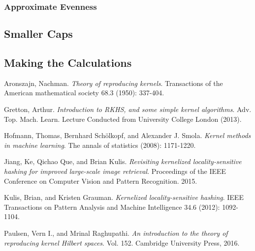 \documentclass[twoside,11pt]{homework}
\begin{document}
\begin{multicols}{2}
\subsubsection{Approximate Evenness}



\subsection{Smaller Caps}

\subsection{Making the Calculations}

\begin{thebibliography}{9}
  
 Aronszajn, Nachman. \emph{Theory of reproducing kernels}. Transactions of the American mathematical society 68.3 (1950): 337-404.

 Gretton, Arthur. \emph{Introduction to RKHS, and some simple kernel algorithms}. Adv. Top. Mach. Learn. Lecture Conducted from University College London (2013).

 Hofmann, Thomas, Bernhard Schölkopf, and Alexander J. Smola. \emph{Kernel methods in machine learning}. The annals of statistics (2008): 1171-1220.

 Jiang, Ke, Qichao Que, and Brian Kulis. \emph{Revisiting kernelized locality-sensitive hashing for improved large-scale image retrieval}. Proceedings of the IEEE Conference on Computer Vision and Pattern Recognition. 2015.
  
 Kulis, Brian, and Kristen Grauman. \emph{Kernelized locality-sensitive hashing}. IEEE Transactions on Pattern Analysis and Machine Intelligence 34.6 (2012): 1092-1104.

 Paulsen, Vern I., and Mrinal Raghupathi. \emph{An introduction to the theory of reproducing kernel Hilbert spaces}. Vol. 152. Cambridge University Press, 2016. 

\end{thebibliography}

\end{multicols}
\end{document}
